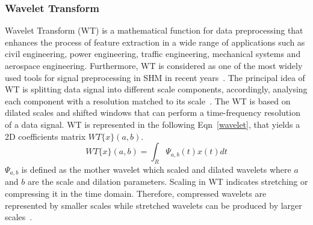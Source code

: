 \subsubsection{Wavelet Transform} 
Wavelet Transform (WT) is a mathematical function for data preprocessing that enhances the process of feature extraction in a wide range of applications such as civil engineering, power engineering, traffic engineering, mechanical systems and aerospace engineering.
Furthermore, WT is considered as one of the most widely used tools for signal preprocessing in SHM in recent years~\cite{Taha2006}.
The principal idea of WT is splitting data signal into different scale components, accordingly, analysing each component with a resolution matched to its scale~\cite{Graps1995}.
The WT is based on dilated scales and shifted windows that can perform a time-frequency resolution of a data signal. 
WT is represented in the following Eqn~\ref{wavelet}, that yields a 2D coefficients matrix  $WT\{x\}(a,b)$. 
\begin{equation}
	WT\{x\}(a,b) = \int_{R}^{}\Psi_{a,b}(t)x(t)dt
	\label{wavelet}
\end{equation}
$\Psi_{a,b}$ is defined as the mother wavelet which scaled and dilated wavelets  where $a$ and $b$ are the scale and dilation parameters.
Scaling in WT indicates stretching or compressing it in the time domain. 
Therefore, compressed wavelets are represented by smaller scales while stretched wavelets can be produced by larger scales~\cite{Graps1995}.
%

